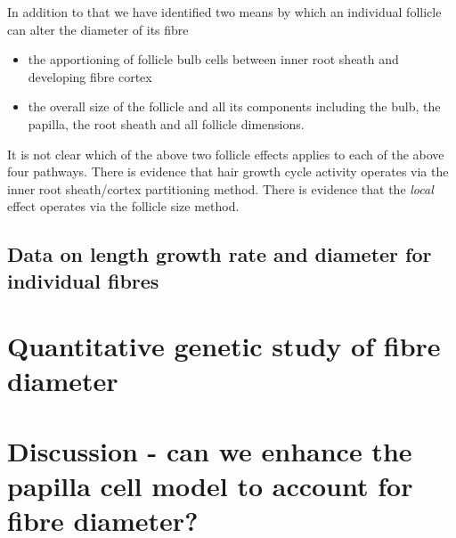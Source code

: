 \documentclass[titlepage]{article}  %
\begin{document}
In addition to that we have identified two means by which an individual follicle can alter the diameter of its fibre
\begin{itemize}
\item the apportioning of follicle bulb cells between inner root sheath and developing fibre cortex
\item the overall size of the follicle and all its components including the bulb, the papilla, the root sheath and all follicle dimensions.
\end{itemize}

It is not clear which of the above two follicle effects applies to each of the above four pathways.  There is evidence that hair growth cycle activity operates via the inner root sheath/cortex partitioning method. There is evidence that the {\em local} effect operates via the follicle size method. 

\subsection{Data on length growth rate and diameter for individual fibres}

\section{Quantitative genetic study of fibre diameter}


\section{Discussion - can we enhance the papilla cell model to account for fibre diameter?}
\end{document}
